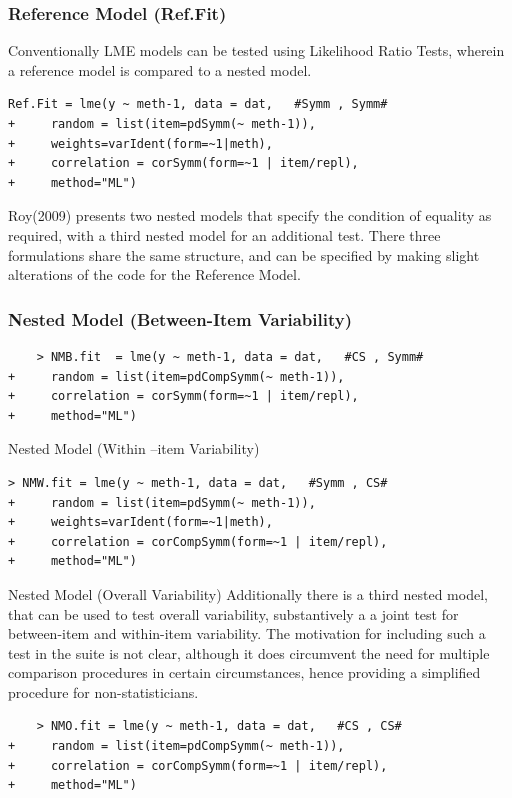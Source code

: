 \documentclass[12pt, a4paper]{report}
\theoremstyle{plain}
\theoremstyle{definition}
\theoremstyle{remark}
\begin{document}
\subsubsection{Reference Model (Ref.Fit)}
Conventionally LME models can be tested using Likelihood Ratio Tests, wherein a reference model is compared to a nested model.
\begin{framed}
\begin{verbatim}
Ref.Fit = lme(y ~ meth-1, data = dat,   #Symm , Symm#
+     random = list(item=pdSymm(~ meth-1)), 
+     weights=varIdent(form=~1|meth),
+     correlation = corSymm(form=~1 | item/repl), 
+     method="ML")
\end{verbatim}
\end{framed}
Roy(2009) presents two nested models that specify the condition of equality as required, with a third nested model for an additional test. There three formulations share the same structure, and can be specified by making slight alterations of the code for the Reference Model.
\subsubsection{Nested Model (Between-Item Variability)}
\begin{framed}
	\begin{verbatim}
	> NMB.fit  = lme(y ~ meth-1, data = dat,   #CS , Symm#
+     random = list(item=pdCompSymm(~ meth-1)),
+     correlation = corSymm(form=~1 | item/repl), 
+     method="ML")
\end{verbatim}
\end{framed}

Nested Model (Within –item Variability)
\begin{framed}
	\begin{verbatim}
> NMW.fit = lme(y ~ meth-1, data = dat,   #Symm , CS# 
+     random = list(item=pdSymm(~ meth-1)),
+     weights=varIdent(form=~1|meth), 
+     correlation = corCompSymm(form=~1 | item/repl), 
+     method="ML")
\end{verbatim}
\end{framed}



Nested Model (Overall Variability)
Additionally there is a third nested model, that can be used to test overall variability, substantively a a joint test for between-item and within-item variability. The motivation for including such a test in the suite is not clear, although it does circumvent the need for multiple comparison procedures in certain circumstances, hence providing a simplified procedure for non-statisticians.
\begin{framed}
	\begin{verbatim}   
	> NMO.fit = lme(y ~ meth-1, data = dat,   #CS , CS# 
+     random = list(item=pdCompSymm(~ meth-1)), 
+     correlation = corCompSymm(form=~1 | item/repl), 
+     method="ML")
\end{verbatim}
\end{framed}
\end{document}
